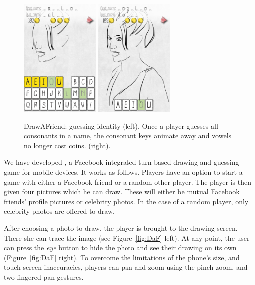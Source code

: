 \begin{figure}
  \centering%
\includegraphics[width=1.5in]{DaF/angelina_guess1.png}
\hspace{0.1in}
\includegraphics[width=1.5in]{DaF/angelina_guess2.png}
  \caption{DrawAFriend: guessing identity (left). Once a player guesses all consonants in a name, the consonant keys animate away and vowels no longer cost coins. (right).}
  \label{fig:DaF2}
\end{figure}

We have developed \daf, a Facebook-integrated turn-based drawing and guessing game for mobile devices.  It works as follows. Players have an option to start a game with either a Facebook friend or a random other player.  The player is then given four pictures which he can draw. These will either be mutual Facebook friends' profile pictures or  celebrity photos. In the case of a random player, only celebrity photos are offered to draw.

After choosing a photo to draw, the player is brought to the drawing screen. There she can trace the image (see Figure~\ref{fig:DaF} left). At any point, the user can press the {\em eye} button to hide the photo and see their drawing on its own (Figure~\ref{fig:DaF} right). To overcome the limitations of the phone's size, and touch screen inaccuracies, players can pan and zoom using the pinch zoom, and two fingered pan gestures.

